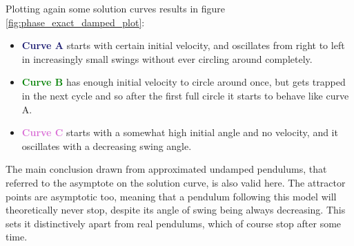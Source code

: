 \documentclass[12pt, a4paper, titlepage]{article}
\theoremstyle{definition}
\numberwithin{equation}{section}
\theoremstyle{definition}
\theoremstyle{definition}
\begin{document}
Plotting again some solution curves results in figure \ref{fig:phase_exact_damped_plot}:
\begin{itemize}
\item \textcolor{MidnightBlue}{\textbf{Curve A}} starts with certain initial velocity, and oscillates from right to left in increasingly small swings without ever circling around completely.
\item \textcolor{Green}{\textbf{Curve B}} has enough initial velocity to circle around once, but gets trapped in the next cycle and so after the first full circle it starts to behave like curve A.
\item \textcolor{Orchid}{\textbf{Curve C}} starts with a somewhat high initial angle and no velocity, and it oscillates with a decreasing swing angle.
\end{itemize}
The main conclusion drawn from approximated undamped pendulums, that referred to the asymptote on the solution curve, is also valid here. The attractor points are asymptotic too, meaning that a pendulum following this model will theoretically never stop, despite its angle of swing being always decreasing. This sets it distinctively apart from real pendulums, which of course stop after some time.
\end{document}
